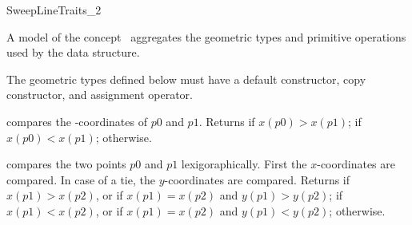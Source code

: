 

\begin{ccRefConcept}{SweepLineTraits_2}


\ccDefinition
  
A model of the concept \ccRefName\ aggregates the geometric types and
primitive operations used by the
data structure.


\ccTypes

The geometric types defined below must have a default constructor,
copy constructor, and assignment operator.
    




\ccOperations

         {compares the -coordinates of $p0$ and $p1$.  Returns
           if $x(p0) > x(p1)$;  if
	  $x(p0) < x(p1)$;  otherwise.}
    
	 {compares the two points $p0$ and $p1$ lexigoraphically. First the
	   $x$-coordinates are compared. In case of a tie, the $y$-coordinates
	   are compared. Returns  if $x(p1) > x(p2)$, or if
	   $x(p1) = x(p2)$ and $y(p1) > y(p2)$;
	    if $x(p1) < x(p2)$, or if $x(p1) = x(p2)$ and
	   $y(p1) < y(p2)$;
	    otherwise.}


\end{ccRefConcept}
